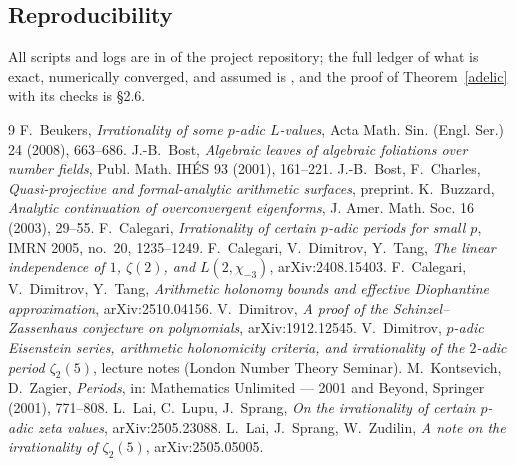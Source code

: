 \documentclass[11pt]{amsart}
\theoremstyle{remark}
\begin{document}
\subsection*{Reproducibility} All scripts and logs are in  of the project repository; the full ledger of what is exact, numerically converged, and assumed is , and the proof of Theorem~\ref{adelic} with its checks is  \S2.6.

\begin{thebibliography}{9}
 F.~Beukers, \emph{Irrationality of some $p$-adic $L$-values}, Acta Math. Sin. (Engl. Ser.) 24 (2008), 663--686.
 J.-B.~Bost, \emph{Algebraic leaves of algebraic foliations over number fields}, Publ. Math. IH\'ES 93 (2001), 161--221.
 J.-B.~Bost, F.~Charles, \emph{Quasi-projective and formal-analytic arithmetic surfaces}, preprint.
 K.~Buzzard, \emph{Analytic continuation of overconvergent eigenforms}, J. Amer. Math. Soc. 16 (2003), 29--55.
 F.~Calegari, \emph{Irrationality of certain $p$-adic periods for small $p$}, IMRN 2005, no.~20, 1235--1249.
 F.~Calegari, V.~Dimitrov, Y.~Tang, \emph{The linear independence of $1$, $\zeta(2)$, and $L(2,\chi_{-3})$}, arXiv:2408.15403.
 F.~Calegari, V.~Dimitrov, Y.~Tang, \emph{Arithmetic holonomy bounds and effective Diophantine approximation}, arXiv:2510.04156.
 V.~Dimitrov, \emph{A proof of the Schinzel--Zassenhaus conjecture on polynomials}, arXiv:1912.12545.
 V.~Dimitrov, \emph{$p$-adic Eisenstein series, arithmetic holonomicity criteria, and irrationality of the $2$-adic period $\zeta_2(5)$}, lecture notes (London Number Theory Seminar).
 M.~Kontsevich, D.~Zagier, \emph{Periods}, in: Mathematics Unlimited --- 2001 and Beyond, Springer (2001), 771--808.
 L.~Lai, C.~Lupu, J.~Sprang, \emph{On the irrationality of certain $p$-adic zeta values}, arXiv:2505.23088.
 L.~Lai, J.~Sprang, W.~Zudilin, \emph{A note on the irrationality of $\zeta_2(5)$}, arXiv:2505.05005.
\end{thebibliography}
\end{document}
